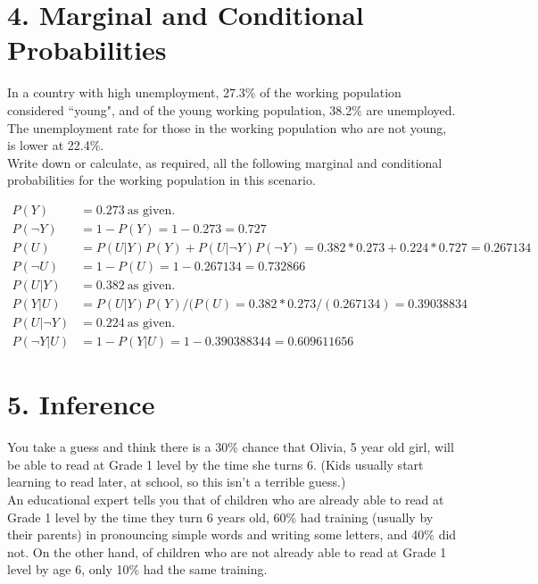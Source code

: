 \documentclass[11pt]{report}
\begin{document}
\newpage
\section*{4. Marginal and Conditional Probabilities}
In a country with high unemployment, 27.3\% of the working population considered ``young", and of the young working population, 38.2\% are unemployed. The unemployment rate for those in the working population who are not young, is lower at 22.4\%. \\

Write down or calculate, as required, all the following marginal and conditional probabilities for the working population in this scenario.\\

\hrulefill

\begin{align*} 
P(Y) &= 0.273 \ \text{as given.}\\
P(\neg Y) &= 1 - P(Y) = 1 - 0.273 = 0.727\\
P(U) &= P(U|Y)P(Y) + P(U|\neg Y)P(\neg Y) = 0.382*0.273 + 0.224*0.727 = 0.267134\\
P(\neg U) &= 1 - P(U) = 1- 0.267134 = 0.732866\\
P(U | Y) &= 0.382\ \text{as given.}\\
P(Y |  U) &= P(U | Y)P(Y)/(P(U) = 0.382*0.273/(0.267134) = 0.39038834\\
P(U | \neg Y) &= 0.224\ \text{as given.}\\
P(\neg Y | U) &= 1 - P(Y|U )=1 - 0.390388344 = 0.609611656
\end{align*}

\newpage


\section*{5. Inference}
You take a guess and think there is a 30\% chance that Olivia, 5 year old girl, will be able to read at Grade 1 level by the time she turns 6. (Kids usually start learning to read later, at school, so this isn’t a terrible guess.) \\

An educational expert tells you that of children who are already able to read at Grade 1 level by the time they turn 6 years old, 60\% had training (usually by their parents) in pronouncing simple words and writing some letters, and 40\% did not. On the other hand, of children who are not already able to read at Grade 1 level by age 6, only 10\% had the same training.
\end{document}
